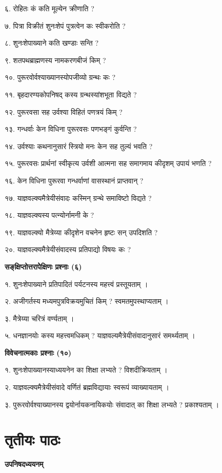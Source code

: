 \documentclass[11pt, a5paper]{article}
\begin{document}
६. रोहितः कं कति मूल्येन क्रीणाति ?

७. पित्रा विक्रीतं शुनःशेपं पुत्रत्वेन कः स्वीकरोति ?

८. शुनःशेपाख्याने कति खण्डाः सन्ति ?

९. शतपथब्राह्मणस्य नामकरणबीजं किम्  ?

१०. पुरूरवोर्वश्याख्यानस्योपजीव्यो ग्रन्थः कः ?

११. बृहदारण्यकोपनिषद् कस्य ग्रन्थस्यांशभूता विद्यते ?

१२. पुरूरवसा सह उर्वश्या विहितं पणत्रयं किम् ?

१३. गन्धर्वाः केन विधिना पुरूरवसः पणभङ्गं कुर्वन्ति ?

१४. उर्वश्याः कथनानुसारं स्त्रियो मनः केन सह तुल्यं भवति ?

१५. पुरूरवसः प्रार्थनां स्वीकृत्य उर्वशी आत्मना सह समागमाय कीदृशम् उपायं भणति ?

१६. केन विधिना पुरूरवा गन्धर्वाणां वासस्थानं प्राप्तवान् ?

१७. याज्ञवल्क्यमैत्रेयीसंवादः कस्मिन् ग्रन्थे समाविष्टो विद्यते ?

१८. याज्ञवल्क्यस्य पत्न्योर्नामनी के ?

१९. याज्ञवल्क्यो मैत्रेय्या कीदृशेन वचनेन हृष्टः सन् उपदिशति ?

२०. याज्ञवल्क्यमैत्रेयीसंवादस्य प्रतिपाद्यो विषयः कः ?

\textbf{सङ्‌क्षिप्तोत्तरापेेक्षिणः प्रश्नाः (६)}

१‍. शुनःशेपाख्याने प्रतिपादितं पर्यटनस्य महत्त्वं प्रस्तूयताम् ।

२. अजीगर्तस्य मध्यमपुत्रविक्रयमुचितं किम् ? स्वमतमुपस्थाप्यताम् ।

३‍. मैत्रेय्या चरित्रं वर्ण्यताम् ।

५. धनज्ञानयोः कस्य महत्त्वमधिकम् ? याज्ञवल्यमैत्रेयीसंवादानुसारं समर्थ्यताम् ।

\textbf{विवेचनात्मकाः प्रश्नाः (१०)}

१. शुनःशेपाख्यानस्याध्ययनेन का शिक्षा लभ्यते ? विशदीक्रियताम् ।

२. याज्ञवल्क्यमैत्रेयीसंवादे वर्णितं ब्रह्मविद्यायाः स्वरूपं व्याख्यायताम् ।

३. पुरूरवोर्वश्याख्यानस्य द्वयोर्नायकनायिकयोः संवादात् का शिक्षा लभ्यते ? प्रकाश्यताम् ।

\section{\textbf{तृतीयः पाठः}}

\textbf{उपनिषदध्ययनम्}
\end{document}
